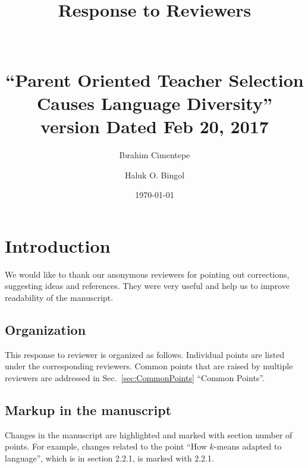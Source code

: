 \documentclass[10.5pt]{amsart}
\newcommand{\hbTimeStamp}{{\color{red}--Draft-- v\today}} %
\newcommand{\refsec}[1]{Sec.~\ref{#1}}
\newcommand{\hbRoRCommonPoints}{``Common Points''}
\begin{document}
\title[Parent Oriented Teacher Selection Causes Language Diversity]{
	Response to Reviewers\\
	~\\
	~\\
	{\footnotesize
		``Parent Oriented Teacher Selection Causes Language Diversity''\\
		version Dated Feb 20, 2017
	}
}
\author{Ibrahim Cimentepe}
\author{Haluk O. Bingol}

\date{\today}


\maketitle




\section{Introduction}

We would like to thank our anonymous reviewers 
for pointing out corrections, suggesting ideas and references.
They were very useful and help us to improve readability of the manuscript.




\subsection{Organization}

This response to reviewer is organized as follows.
Individual points are listed under the corresponding reviewers.
Common points that are raised by multiple reviewers 
are addressed in  \refsec{sec:CommonPoints} \hbRoRCommonPoints.




\subsection{Markup in the manuscript}

Changes in the manuscript are highlighted and marked with section number of points.
For example,
changes related to the point
``How $k$-means adapted to language'', 
which is in section 2.2.1,
is marked with 2.2.1.
\end{document}
